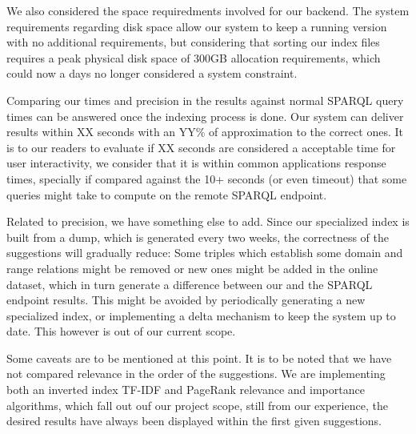 
We also considered the space requiredments involved for our backend. The system requirements regarding disk space allow our system to keep a running version with no additional requirements, but considering that sorting our index files requires a peak physical disk space of 300GB allocation requirements, which could now a days no longer considered a system constraint.

Comparing our times and precision in the results against normal SPARQL query times can be answered once the indexing process is done. Our system can deliver results within XX seconds with an YY\% of approximation to the correct ones. It is to our readers to evaluate if XX seconds are considered a acceptable time for user interactivity, we consider that it is within common applications response times, specially if compared against the 10+ seconds (or even timeout) that some queries might take to compute on the remote SPARQL endpoint.

Related to precision, we have something else to add. Since our specialized index is built from a dump, which is generated every two weeks, the correctness of the suggestions will gradually reduce: Some triples which establish some domain and range relations might be removed or new ones might be added in the online dataset, which in turn generate a difference between our and the SPARQL endpoint results. This might be avoided by periodically generating a new specialized index, or implementing a delta mechanism to keep the system up to date. This however is out of our current scope.

Some caveats are to be mentioned at this point. It is to be noted that we have not compared relevance in the order of the suggestions. We are implementing both an inverted index TF-IDF and PageRank relevance and importance algorithms, which fall out ouf our project scope, still from our experience, the desired results have always been displayed within the first given suggestions.
